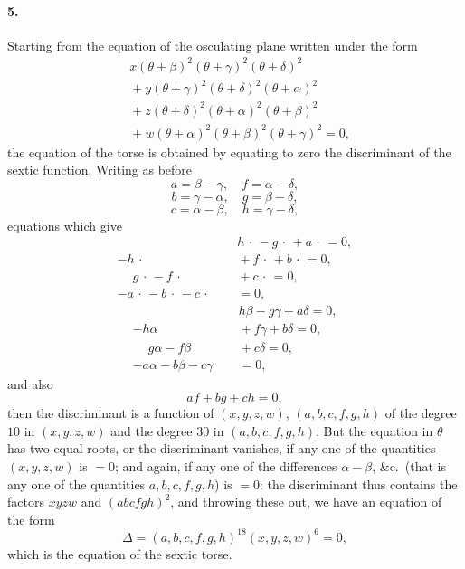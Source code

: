 \documentclass[11pt,a4paper]{article}
\begin{document}
\paragraph{5.}
Starting from the equation of the osculating plane written under the form
\[
\begin{aligned}
& x(\theta + \beta)^2(\theta + \gamma)^2(\theta + \delta)^2 \\
& {} + y(\theta + \gamma)^2(\theta + \delta)^2(\theta + \alpha)^2 \\
& {} + z(\theta + \delta)^2(\theta + \alpha)^2(\theta + \beta)^2 \\
& {} + w(\theta + \alpha)^2(\theta + \beta)^2(\theta + \gamma)^2 = 0,
\end{aligned}
\]
the equation of the torse is obtained by equating to zero the discriminant of the
sextic function. Writing as before
\[
a = \beta - \gamma,\quad f = \alpha - \delta,
\]
\[
b = \gamma - \alpha,\quad g = \beta - \delta,
\]
\[
c = \alpha - \beta,\quad h = \gamma - \delta,
\]
equations which give
\[
\begin{aligned}
&{}\phantom{-} h\,\cdot\, - g\,\cdot\, + a\,\cdot\, = 0,\\
-h\,\cdot\, &{}\phantom{-} + f\,\cdot\, + b\,\cdot\, = 0,\\
\phantom{-} g\,\cdot\, - f\,\cdot\, &{}\phantom{-} + c\,\cdot\, = 0,\\
- a\,\cdot\, - b\,\cdot\, - c\,\cdot\, &{}\phantom{-} = 0,
\end{aligned}
\]
\[
\begin{aligned}
&{}\phantom{-} h\beta - g\gamma + a\delta = 0,\\
- h\alpha &{}\phantom{-} + f\gamma + b\delta = 0,\\
\phantom{-} g\alpha - f\beta &{}\phantom{-} + c\delta = 0,\\
- a\alpha - b\beta - c\gamma &{}\phantom{-} = 0,
\end{aligned}
\]
and also
\[
af + bg + ch = 0,
\]
then the discriminant is a function of $(x, y, z, w)$, $(a, b, c, f, g, h)$ of the
degree $10$ in $(x, y, z, w)$ and the degree $30$ in $(a, b, c, f, g, h)$. But the
equation in $\theta$ has two equal roots, or the discriminant vanishes, if any one of
the quantities $(x, y, z, w)$ is $= 0$; and again, if any one of the differences
$\alpha - \beta$, \&c.\ (that is any one of the quantities $a, b, c, f, g, h$) is $= 0$:
the discriminant thus contains the factors $xyzw$ and $(abcfgh)^2$, and throwing these
out, we have an equation of the form
\[
\Delta = (a, b, c, f, g, h)^{18} (x, y, z, w)^{6} = 0,
\]
which is the equation of the sextic torse.
\end{document}
